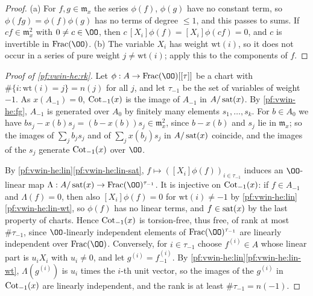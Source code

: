 \begin{proof}
(a) For $f,g\in\mathfrak m_x$ the series $\phi(f)$, $\phi(g)$ have no constant term, so $\phi(fg)=\phi(f)\phi(g)$
has no terms of degree $\le1$, and this passes to sums. If $cf\in\mathfrak m_x^2$ with $0\ne c\in\OO$, then
$c\,[X_i]\phi(f)=[X_i]\phi(cf)=0$, and $c$ is invertible in $\mathrm{Frac}(\OO)$. (b) The variable $X_i$ has weight
$\mathrm{wt}(i)$, so it does not occur in a series of pure weight $j\ne\mathrm{wt}(i)$; apply this to the components
of $f$.
\end{proof}

\begin{proof}[Proof of \cref{pf:vwin-he:rk}]
Let $\phi:A\to\mathrm{Frac}(\OO)[[\tau]]$ be a chart with $\#\{i:\mathrm{wt}(i)=j\}=n(j)$ for all $j$, and let
$\tau_{-1}$ be the set of variables of weight $-1$. As $x(A_{-1})=0$, $\operatorname{Cot}_{-1}(x)$ is the image of $A_{-1}$ in
$A/\operatorname{sat}(x)$. By \cref{pf:vwin-he:fg}, $A_{-1}$ is generated over $A_0$ by finitely many elements
$s_1,\dots,s_k$. For $b\in A_0$ we have $bs_j-x(b)s_j=(b-x(b))s_j\in\mathfrak m_x^2$, since $b-x(b)$ and $s_j$ lie in
$\mathfrak m_x$; so the images of $\sum_jb_js_j$ and of $\sum_jx(b_j)s_j$ in $A/\operatorname{sat}(x)$ coincide, and the
images of the $s_j$ generate $\operatorname{Cot}_{-1}(x)$ over $\OO$.

By \cref{pf:vwin-he:lin}\ref{pf:vwin-he:lin-sat}, $f\mapsto([X_i]\phi(f))_{i\in\tau_{-1}}$ induces an $\OO$-linear map
$\Lambda:A/\vwinhesat(x)\to\mathrm{Frac}(\OO)^{\tau_{-1}}$. It is injective on $\operatorname{Cot}_{-1}(x)$: if $f\in A_{-1}$
and $\Lambda(f)=0$, then also $[X_i]\phi(f)=0$ for $\mathrm{wt}(i)\ne-1$ by
\cref{pf:vwin-he:lin}\ref{pf:vwin-he:lin-wt}, so $\phi(f)$ has no linear terms, and $f\in\operatorname{sat}(x)$ by the last
property of charts. Hence $\operatorname{Cot}_{-1}(x)$ is torsion-free, thus free, of rank at most $\#\tau_{-1}$, since
$\OO$-linearly independent elements of $\mathrm{Frac}(\OO)^{\tau_{-1}}$ are linearly independent over
$\mathrm{Frac}(\OO)$. Conversely, for $i\in\tau_{-1}$ choose $f^{(i)}\in A$ whose linear part is $u_iX_i$ with
$u_i\ne0$, and let $g^{(i)}=f^{(i)}_{-1}$. By \cref{pf:vwin-he:lin}\ref{pf:vwin-he:lin-wt}, $\Lambda(g^{(i)})$ is $u_i$
times the $i$-th unit vector, so the images of the $g^{(i)}$ in $\operatorname{Cot}_{-1}(x)$ are linearly independent, and the
rank is at least $\#\tau_{-1}=n(-1)$.
\end{proof}

